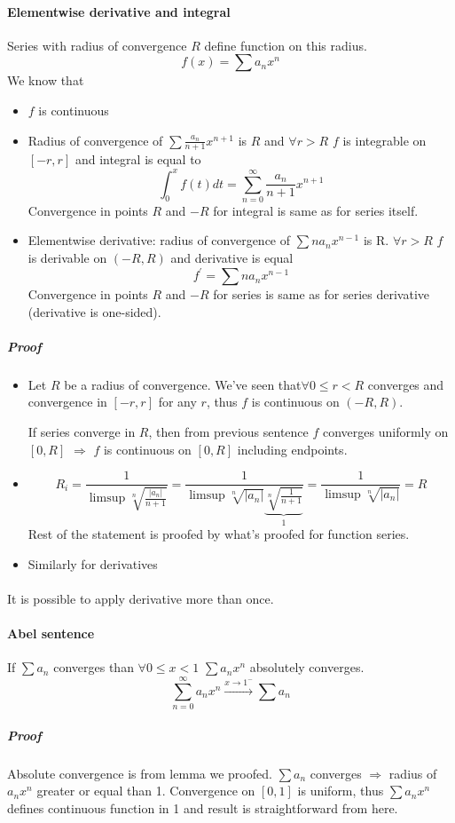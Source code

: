\paragraph{Elementwise derivative and integral}
Series with radius of convergence $R$ define function on this radius.
$$f(x) = \sum a_n x^n$$
We know that
\begin{itemize}
	\item $f$ is continuous
	\item Radius of convergence of $ \sum \frac{a_n}{n+1} x^{n+1}$
	is $R$ and $\forall r > R$ $f$ is integrable on $[-r,r]$ and integral is equal to 
	$$\int_0^x f(t) dt = \sum_{n=0}^{\infty} \frac{a_n}{n+1} x^{n+1}$$
	Convergence in points $R$ and $-R$ for integral is same as for series itself.
	\item Elementwise derivative: radius of convergence of $ \sum na_nx^{n-1}$ is R. $\forall r > R$  $f$ is derivable on $(-R,R)$ and derivative is equal
	$$f^\prime = \sum na_nx^{n-1}$$
	Convergence in points $R$ and $-R$  for  series is same as for series derivative (derivative is one-sided).
\end{itemize}
\subparagraph{Proof}
\begin{itemize}
	\item Let $R$ be a radius of convergence. We've seen that$\forall 0\leq r< R$ converges and convergence in $[-r,r]$ for any $r$, thus $f$ is continuous on $(-R,R)$.
	
	If series converge in $R$, then from previous sentence $f$ converges uniformly on $[0,R]$ $\Rightarrow$ $f$ is continuous on $[0,R]$ including endpoints. 
	\item $$R_i = \frac{1}{\limsup \sqrt[n]{\frac{|a_n|}{n+1}}} = \frac{1}{\limsup \sqrt[n]{|a_n|} \underbrace{\sqrt[n]{\frac{1}{n+1}}}_{1}} = \frac{1}{\limsup \sqrt[n]{|a_n|}} = R$$
	Rest of the statement is proofed by what's proofed for function series.
	\item Similarly for derivatives
\end{itemize}
\paragraph{}
It is possible to apply derivative more than once.
\paragraph{Abel sentence}
If $\sum a_n$ converges than $\forall 0 \leq x < 1$ $\sum a_n x^n$ absolutely converges.
$$\sum_{n=0}^\infty a_n x^n \stackrel{x\to 1^-}{\to} \sum a_n$$
\subparagraph{Proof}
Absolute convergence is from lemma we proofed. 
$\sum a_n$ converges $\Rightarrow$ radius of $a_n x^n$ greater or equal than 1. Convergence on $[0,1]$ is uniform, thus $\sum a_n x^n$ defines continuous function in 1 and result is straightforward from here.
